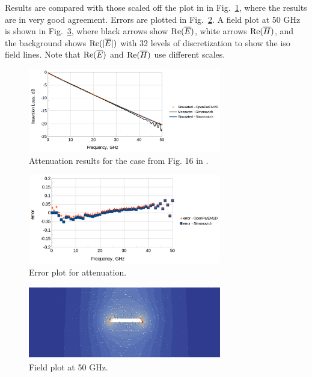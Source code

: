 \documentclass[titlepage]{article}
\renewcommand\_{\textunderscore\linebreak[1]}
\begin{document}
Results are compared with those scaled off the plot in \cite{Simonovich} in Fig.~\ref{fig:stripline_results}, where the results are in very good agreement.  Errors are plotted in Fig.~\ref{fig:stripline_error}. A field plot at 50 GHz is shown in Fig.~\ref{fig:stripline_plot}, where black arrows show $\textnormal{Re}(\overline{E})$, white arrows $\textnormal{Re}(\overline{H})$, and the background shows $\textnormal{Re}(|\overline{E}|)$ with 32 levels of discretization to show the iso field lines. Note that $\textnormal{Re}(\overline{E})$ and $\textnormal{Re}(\overline{H})$ use different scales.
\begin{figure}[H]
  \centering
  \includegraphics[width=0.75\textwidth]{../regression/OpenParEM2D/Simonovich_stripline_study/screenshots/stripline_results}
  \caption{Attenuation results for the case from Fig. 16 in \cite{Simonovich}.}
  \label{fig:stripline_results}
\end{figure}
\begin{figure}[H]
  \centering
  \includegraphics[width=0.75\textwidth]{../regression/OpenParEM2D/Simonovich_stripline_study/screenshots/stripline_error}
  \caption{Error plot for attenuation.}
  \label{fig:stripline_error}
\end{figure}
\begin{figure}[H]
  \centering
  \includegraphics[width=0.75\textwidth]{../regression/OpenParEM2D/Simonovich_stripline_study/screenshots/stripline_plot}
  \caption{Field plot at 50 GHz.}
  \label{fig:stripline_plot}
\end{figure}
\end{document}
